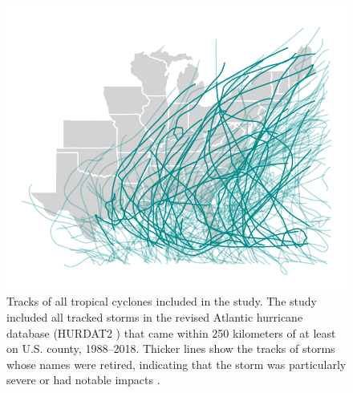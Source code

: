 \documentclass[fleqn,10pt,lineno]{olplainarticle}
\begin{document}
\newpage

\begin{figure}[tbhp!]
\centering
\includegraphics[width=0.7\linewidth]{figures/hurrtracks}
\caption{Tracks of all tropical cyclones included in the study. The study included all tracked storms in the revised Atlantic hurricane database (HURDAT2 \cite{landsea2013}) that came within 250 kilometers of at least on U.S. county, 1988--2018. Thicker lines show the tracks of storms whose names were retired, indicating that the storm was particularly severe or had notable impacts \cite{retirednames}.}
\label{fig:hurrtracks}
\end{figure}

\clearpage
\end{document}
